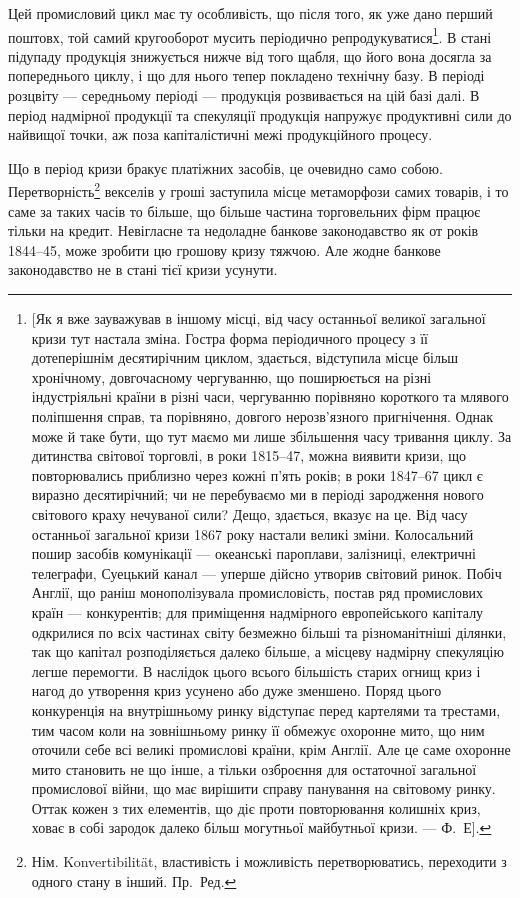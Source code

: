 Цей промисловий цикл має ту особливість, що після того, як уже дано перший
поштовх, той самий кругооборот мусить періодично репродукуватися\footnote{
[Як я вже зауважував в іншому місці, від часу останньої великої загальної кризи тут настала
зміна. Гостра форма періодичного процесу з її дотеперішнім десятирічним циклом, здається, відступила
місце більш хронічному, довгочасному чергуванню, що поширюється на різні індустріяльні країни в
різні
часи, чергуванню порівняно короткого та млявого поліпшення справ, та порівняно, довгого
нерозв'язного
пригнічення. Однак може й таке бути, що тут маємо ми лише збільшення часу тривання циклу. За
дитинства
світової торговлі, в роки 1815--47, можна виявити кризи, що повторювались приблизно через
кожні п’ять років; в роки 1847--67 цикл є виразно десятирічний; чи не перебуваємо ми в періоді
зародження нового світового краху нечуваної сили? Дещо, здається, вказує на це. Від часу останньої
загальної кризи 1867 року настали великі зміни. Колосальний пошир засобів комунікації — океанські
пароплави,
залізниці, електричні телеграфи, Суецький канал — уперше дійсно утворив світовий ринок. Побіч
Англії, що раніш монополізувала промисловість, постав ряд промислових країн — конкурентів; для
приміщення надмірного европейського капіталу одкрилися по всіх частинах світу безмежно більші та
різноманітніші ділянки, так що капітал розподіляється далеко більше, а місцеву надмірну спекуляцію
легше перемогти. В наслідок цього всього більшість старих огнищ криз і нагод до утворення криз
усунено
або дуже зменшено. Поряд цього конкуренція на внутрішньому ринку відступає перед картелями та
трестами, тим часом коли на зовнішньому ринку її обмежує охоронне мито, що ним оточили себе всі
великі
промислові країни, крім Англії. Але це саме охоронне мито становить не що інше, а тільки озброєння
для остаточної загальної промислової війни, що має вирішити справу панування на світовому ринку.
Оттак кожен з тих елементів, що діє проти повторювання колишніх криз, ховає в собі зародок далеко
більш могутньої майбутньої кризи. — Ф.~Е].
}. В стані
підупаду продукція знижується нижче від того щабля, що його вона досягла
за попереднього циклу, і що для нього тепер покладено технічну базу. В періоді
розцвіту — середньому періоді — продукція розвивається на цій базі далі. В період
надмірної продукції та спекуляції продукція напружує продуктивні сили до найвищої
точки, аж поза капіталістичні межі продукційного процесу.

Що в період кризи бракує платіжних засобів, це очевидно само собою.
Перетворність\footnote*{
Нім. Konvertibilität, властивість і можливість перетворюватись, переходити
з одного стану в інший. Пр.~Ред.
} векселів у гроші заступила місце метаморфози самих товарів,
і то саме за таких часів то більше, що більше частина торговельних фірм працює
тільки на кредит. Невігласне та недоладне банкове законодавство як от
років 1844--45, може зробити цю грошову кризу тяжчою. Але жодне банкове
законодавство не в стані тієї кризи усунути.

